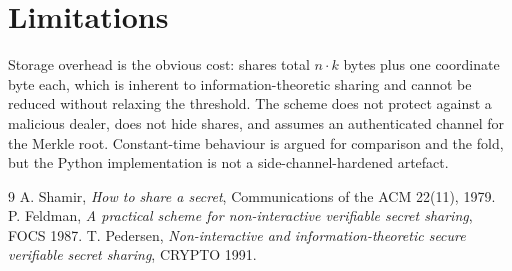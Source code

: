 \documentclass[11pt]{article}
\begin{document}
\section{Limitations}
Storage overhead is the obvious cost: shares total $n \cdot k$ bytes plus one coordinate byte each,
which is inherent to information-theoretic sharing and cannot be reduced without relaxing the
threshold. The scheme does not protect against a malicious dealer, does not hide shares, and assumes
an authenticated channel for the Merkle root. Constant-time behaviour is argued for comparison and
the fold, but the Python implementation is not a side-channel-hardened artefact.

\begin{thebibliography}{9}
 A. Shamir, \emph{How to share a secret}, Communications of the ACM 22(11), 1979.
 P. Feldman, \emph{A practical scheme for non-interactive verifiable secret sharing}, FOCS 1987.
 T. Pedersen, \emph{Non-interactive and information-theoretic secure verifiable secret sharing}, CRYPTO 1991.
\end{thebibliography}
\end{document}
